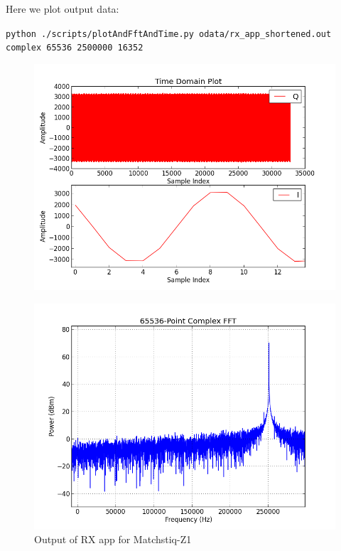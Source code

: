 \small
\noindent Here we plot output data:\par\medskip
\noindent\texttt{python ./scripts/plotAndFftAndTime.py odata/rx\_app\_shortened.out complex 65536 2500000 16352}\par\medskip
\pagebreak
        \begin{figure}[h]
                \centering
                \includegraphics[scale=.5]{rx_app_sig_gen_time_domain}
                \label{fig:rx_app_sig_gen_time_domain}
        \end{figure}
        \begin{figure}[h]
                \centering
                \includegraphics[scale=.5]{rx_app_sig_gen_fft}
                \caption{Output of RX app for Matchstiq-Z1}
                \label{fig:rx_app_sig_gen_fft}
        \end{figure}
